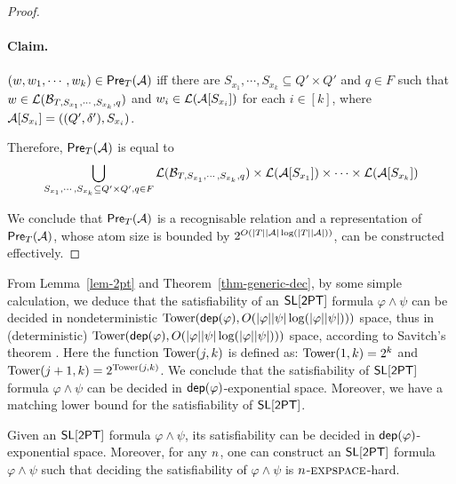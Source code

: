 \begin{proof}


\paragraph{Claim.} %
$(w, w_1,\cdots, w_k) \in \textsf{Pre}_{T}(\mathcal{A})$ iff there are $S_{x_1}, \cdots, S_{x_k} \subseteq Q' \times Q'$ and $q \in F$ such that $w \in \mathcal{L}(\mathcal{B}_{T, S_{x_1}, \cdots, S_{x_k}, q})$ and $w_i \in \mathcal{L}(\mathcal{A}[S_{x_i}])$ for each $i \in [k]$, where $\mathcal{A}[S_{x_i}]=((Q', \delta'), S_{x_i})$.

\medskip


Therefore, $\textsf{Pre}_{T}(\mathcal{A})$ is equal to 
\[
\bigcup_{S_{x_1}, \cdots, S_{x_k} \subseteq Q' \times Q', q\in F} \mathcal{L}(\mathcal{B}_{T, S_{x_1}, \cdots, S_{x_k},q}) \times \mathcal{L}(\mathcal{A}[S_{x_1}]) \times \cdots  \times \mathcal{L}(\mathcal{A}[S_{x_k}])\]
 


We conclude that $\textsf{Pre}_{T}(\mathcal{A})$ is a recognisable relation and a representation of $\textsf{Pre}_{T}(\mathcal{A})$, whose atom size is bounded by $2^{O(|T||\mathcal{A}|\log (|T||\mathcal{A}|))}$, can be constructed effectively.
\end{proof}

From Lemma~\ref{lem-2pt} and Theorem~\ref{thm-generic-dec}, by some simple calculation, we deduce that the satisfiability of an $\textsf{SL}[\textsf{2PT}]$ formula $\varphi \wedge \psi$ can be decided in 
nondeterministic $\mathrm{Tower}(\mathsf{dep}(\varphi), O(|\varphi| |\psi| \log(|\varphi| |\psi|) ))$ space, thus in (deterministic) $\mathrm{Tower}(\mathsf{dep}(\varphi), O(|\varphi| |\psi| \log(|\varphi| |\psi|) ))$ space, according to Savitch's theorem \cite{Savitch70}. Here the function $\mathrm{Tower}(j, k)$ is %
defined as: $\mathrm{Tower}(1, k)= 2^k$ and $\mathrm{Tower}(j+1, k) = 2^{\mathrm{Tower}(j, k)}$. We conclude that the satisfiability of $\textsf{SL}[\textsf{2PT}]$ formula $\varphi \wedge \psi$ can be decided in $\mathsf{dep}(\varphi)$-exponential space.
Moreover, we have a matching lower bound for the satisfiability of $\textsf{SL}[\textsf{2PT}]$.
%
\begin{theorem}
Given an $\textsf{SL}[\textsf{2PT}]$ formula $\varphi \wedge \psi$, its satisfiability can be decided in $\mathsf{dep}(\varphi)$-exponential space. Moreover,  for any $n$, one can construct an  $\textsf{SL}[\textsf{2PT}]$ formula $\varphi \wedge \psi$ such that deciding the satisfiability of $\varphi \wedge \psi$  %
is $n$-$\textsc{expspace}$-hard.
\end{theorem}


